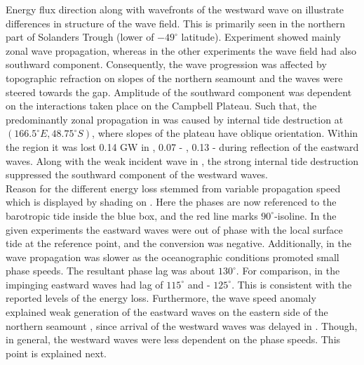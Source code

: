 \documentclass[12pt]{article}
\begin{document}
Energy flux direction along with wavefronts of the westward wave on 
 illustrate differences in structure of the wave field. This is 
primarily seen in the northern part of Solanders Trough (lower of $-49^{\circ}$ latitude). 
Experiment 
 showed mainly zonal wave propagation, whereas in the other experiments the wave field  
had also southward component. Consequently, the wave progression was affected by topographic 
refraction on slopes of the northern seamount and the waves were steered towards the gap. Amplitude 
of the southward component was dependent on the interactions taken place on the Campbell Plateau. 
Such that, the predominantly zonal propagation in  was caused by internal 
tide 
destruction at $(166.5^{\circ}E, 48.75^{\circ}S)$,  where 
slopes of the plateau have oblique orientation. Within the region it was lost 0.14 GW in 
, 0.07 - , 0.13 -  during reflection of the eastward waves. Along 
with the weak incident wave  in , the strong internal tide 
destruction suppressed the southward component of the westward waves.\\

Reason for the different energy loss stemmed from variable propagation speed which is displayed by 
shading on . Here the phases are now referenced to the barotropic 
tide inside the blue box, and the red line marks $90^{\circ}$-isoline. In the given experiments 
the eastward waves were out of phase with the local surface tide at the reference point, and the 
conversion was negative. Additionally, in  the wave propagation was slower as the 
oceanographic conditions promoted small phase speeds. The resultant phase lag was about 
$130^{\circ}$. For comparison, in  
the impinging eastward waves had lag of $115^{\circ}$ and  - $125^{\circ}$. This 
is consistent with the reported levels of the energy loss. Furthermore, the wave speed anomaly 
explained weak generation of the eastward waves on the eastern side of the northern seamount  
, since arrival of the westward waves 
was delayed in  . 
Though, in general, the westward waves were less dependent on the phase speeds. This point is 
explained next.\\
\end{document}
